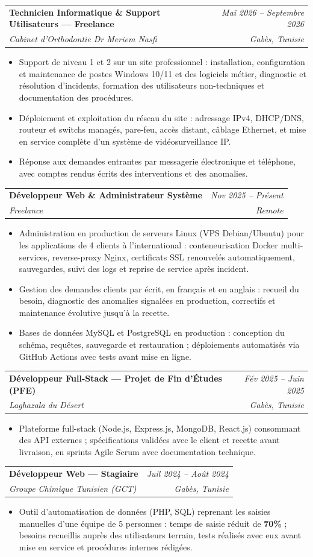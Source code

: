\documentclass[letterpaper,9pt]{article}
\makeatletter
\newcommand{\resumeItem}[1]{\item\small{#1}}
\newcommand{\resumeSubheading}[4]{
  \vspace{-1pt}\item
  \begin{tabular*}{0.97\textwidth}[t]{l@{\extracolsep{\fill}}r}
    \textbf{#1} & \textit{\color{greytext}#2} \\
    \textit{\small\color{greytext} #3} & \textit{\small\color{greytext} #4}
  \end{tabular*}\vspace{-2pt}
}
\newcommand{\resumeItemListStart}{\begin{itemize}[leftmargin=0.24in, label={}, itemsep=0.9pt, topsep=1.2pt, parsep=0pt]}
\newcommand{\resumeItemListEnd}{\end{itemize}\vspace{-2pt}}
\makeatother
\begin{document}
  \resumeSubheading{Technicien Informatique \& Support Utilisateurs --- Freelance}{Mai 2026 -- Septembre 2026}{Cabinet d'Orthodontie Dr Meriem Nasfi}{Gabès, Tunisie}
    \resumeItemListStart
      \resumeItem{Support de niveau 1 et 2 sur un site professionnel : installation, configuration et maintenance de postes Windows 10/11 et des logiciels métier, diagnostic et résolution d'incidents, formation des utilisateurs non-techniques et documentation des procédures.}
      \resumeItem{Déploiement et exploitation du réseau du site : adressage IPv4, DHCP/DNS, routeur et switchs managés, pare-feu, accès distant, câblage Ethernet, et mise en service complète d'un système de vidéosurveillance IP.}
      \resumeItem{Réponse aux demandes entrantes par messagerie électronique et téléphone, avec comptes rendus écrits des interventions et des anomalies.}
    \resumeItemListEnd

  \resumeSubheading{Développeur Web \& Administrateur Système}{Nov 2025 -- Présent}{Freelance}{Remote}
    \resumeItemListStart
      \resumeItem{Administration en production de serveurs Linux (VPS Debian/Ubuntu) pour les applications de 4 clients à l'international : conteneurisation Docker multi-services, reverse-proxy Nginx, certificats SSL renouvelés automatiquement, sauvegardes, suivi des logs et reprise de service après incident.}
      \resumeItem{Gestion des demandes clients par écrit, en français et en anglais : recueil du besoin, diagnostic des anomalies signalées en production, correctifs et maintenance évolutive jusqu'à la recette.}
      \resumeItem{Bases de données MySQL et PostgreSQL en production : conception du schéma, requêtes, sauvegarde et restauration ; déploiements automatisés via GitHub Actions avec tests avant mise en ligne.}
    \resumeItemListEnd

  \resumeSubheading{Développeur Full-Stack --- Projet de Fin d'Études (PFE)}{Fév 2025 -- Juin 2025}{Laghazala du Désert}{Gabès, Tunisie}
    \resumeItemListStart
      \resumeItem{Plateforme full-stack (Node.js, Express.js, MongoDB, React.js) consommant des API externes ; spécifications validées avec le client et recette avant livraison, en sprints Agile Scrum avec documentation technique.}
    \resumeItemListEnd

  \resumeSubheading{Développeur Web --- Stagiaire}{Juil 2024 -- Août 2024}{Groupe Chimique Tunisien (GCT)}{Gabès, Tunisie}
    \resumeItemListStart
      \resumeItem{Outil d'automatisation de données (PHP, SQL) reprenant les saisies manuelles d'une équipe de 5 personnes : temps de saisie réduit de \textbf{70\%} ; besoins recueillis auprès des utilisateurs terrain, tests réalisés avec eux avant mise en service et procédures internes rédigées.}
    \resumeItemListEnd
\end{document}
